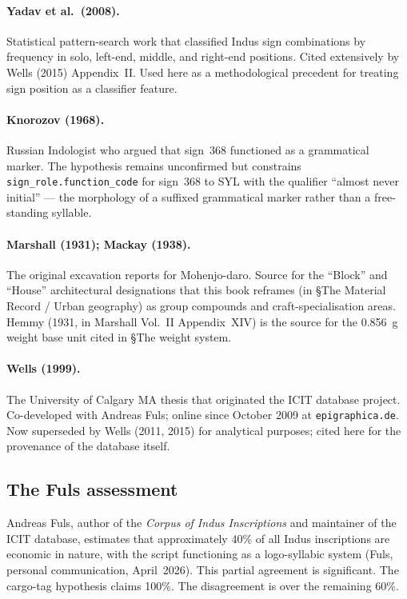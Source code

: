 \paragraph{Yadav et al.\ (2008).}\smartcite{Yadav2008}
Statistical pattern-search work that classified Indus sign
combinations by frequency in solo, left-end, middle, and right-end
positions. Cited extensively by Wells (2015) Appendix~II. Used here
as a methodological precedent for treating sign position as a
classifier feature.

\paragraph{Knorozov (1968).}\smartcite{Knorozov1968}
Russian Indologist who argued that sign~368 functioned as a
grammatical marker. The hypothesis remains unconfirmed but
constrains \texttt{sign\_role.function\_code} for sign~368 to
SYL with the qualifier ``almost never initial'' --- the morphology
of a suffixed grammatical marker rather than a free-standing
syllable.

\paragraph{Marshall (1931); Mackay (1938).}\smartcite{Marshall1931}\smartcite{Mackay1938}
The original excavation reports for Mohenjo-daro. Source for the
``Block'' and ``House'' architectural designations that this book
reframes (in §The Material Record / Urban geography) as group
compounds and craft-specialisation areas. Hemmy (1931, in
Marshall Vol.~II Appendix~XIV) is the source for the
\SI{0.856}{\gram} weight base unit cited in §The weight system.

\paragraph{Wells (1999).}\smartcite{Wells1999}
The University of Calgary MA thesis that originated the ICIT
database project. Co-developed with Andreas Fuls; online since
October 2009 at \texttt{epigraphica.de}. Now superseded by
Wells (2011, 2015) for analytical purposes; cited here for the
provenance of the database itself.

\subsection{The Fuls assessment}

Andreas Fuls, author of the \textit{Corpus of Indus Inscriptions}
and maintainer of the ICIT database, estimates that approximately
40\% of all Indus inscriptions are economic in nature, with the
script functioning as a logo-syllabic system (Fuls, personal
communication, April~2026).
This partial agreement is significant. The cargo-tag hypothesis
claims 100\%. The disagreement is over the remaining 60\%.

